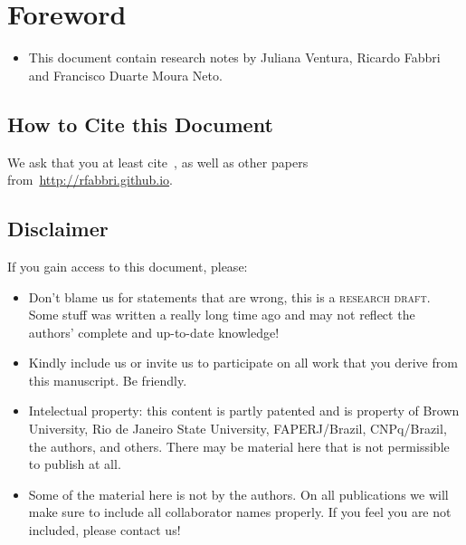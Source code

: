 \pagestyle{fancy}
\fancyhf{}
\fancyfoot[LE,LO,RE,RO]{\thepage}

\tableofcontents
\pagestyle{fancy}
\fancyhf{}
\fancyfoot[LE,LO,RE,RO]{\thepage}

\chapter{Foreword}


\begin{itemize}
\item This document contain research notes by Juliana Ventura, Ricardo Fabbri
  and Francisco Duarte Moura Neto. 
\end{itemize}

\section*{How to Cite this Document}
We ask that you at least
cite~\cite{Fabbri:Kimia:IJCV2016,Fabbri:Kimia:Giblin:ECCV12},
as well as other papers from~\url{http://rfabbri.github.io}.

\section*{Disclaimer}
If you gain access to this document, please:
\begin{itemize}
\item Don't blame us for statements that are wrong, this is a \textsc{research
  draft}. Some stuff was written a really long time ago and may not reflect the
  authors' complete and up-to-date knowledge!
\item Kindly include us or invite us to participate on all work that you derive
  from this manuscript. Be friendly.
\item Intelectual property: this content is partly patented and is property of Brown
  University, Rio de Janeiro State University, FAPERJ/Brazil, CNPq/Brazil, the
  authors, and others. There may be material here that is not permissible to publish at all.
\item Some of the material here is not by the authors. On all publications 
  we will make sure to include all collaborator names properly. If you feel you
  are not included, please contact us!
\end{itemize}

